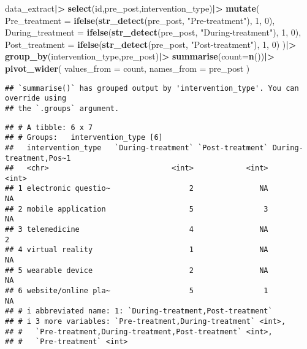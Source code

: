 \documentclass[
]{article}
\newenvironment{Shaded}{\begin{snugshade}}{\end{snugshade}}
\newcommand{\AttributeTok}[1]{\textcolor[rgb]{0.13,0.29,0.53}{#1}}
\newcommand{\DecValTok}[1]{\textcolor[rgb]{0.00,0.00,0.81}{#1}}
\newcommand{\FunctionTok}[1]{\textcolor[rgb]{0.13,0.29,0.53}{\textbf{#1}}}
\newcommand{\NormalTok}[1]{#1}
\newcommand{\SpecialCharTok}[1]{\textcolor[rgb]{0.81,0.36,0.00}{\textbf{#1}}}
\newcommand{\StringTok}[1]{\textcolor[rgb]{0.31,0.60,0.02}{#1}}
\begin{document}
\begin{Shaded}
\begin{Highlighting}[]
\NormalTok{data\_extract}\SpecialCharTok{|\textgreater{}}
  \FunctionTok{select}\NormalTok{(id,pre\_post,intervention\_type)}\SpecialCharTok{|\textgreater{}}
  \FunctionTok{mutate}\NormalTok{(}
    \AttributeTok{Pre\_treatment =} \FunctionTok{ifelse}\NormalTok{(}\FunctionTok{str\_detect}\NormalTok{(pre\_post, }\StringTok{"Pre{-}treatment"}\NormalTok{), }\DecValTok{1}\NormalTok{, }\DecValTok{0}\NormalTok{),}
    \AttributeTok{During\_treatment =} \FunctionTok{ifelse}\NormalTok{(}\FunctionTok{str\_detect}\NormalTok{(pre\_post, }\StringTok{"During{-}treatment"}\NormalTok{), }\DecValTok{1}\NormalTok{, }\DecValTok{0}\NormalTok{),}
    \AttributeTok{Post\_treatment =} \FunctionTok{ifelse}\NormalTok{(}\FunctionTok{str\_detect}\NormalTok{(pre\_post, }\StringTok{"Post{-}treatment"}\NormalTok{), }\DecValTok{1}\NormalTok{, }\DecValTok{0}\NormalTok{)}
\NormalTok{  )}\SpecialCharTok{|\textgreater{}}
  \FunctionTok{group\_by}\NormalTok{(intervention\_type,pre\_post)}\SpecialCharTok{|\textgreater{}}
  \FunctionTok{summarise}\NormalTok{(}\AttributeTok{count=}\FunctionTok{n}\NormalTok{())}\SpecialCharTok{|\textgreater{}}
  \FunctionTok{pivot\_wider}\NormalTok{(}
    \AttributeTok{values\_from =}\NormalTok{ count,}
    \AttributeTok{names\_from =}\NormalTok{ pre\_post}
\NormalTok{  )}
\end{Highlighting}
\end{Shaded}

\begin{verbatim}
## `summarise()` has grouped output by 'intervention_type'. You can override using
## the `.groups` argument.
\end{verbatim}

\begin{verbatim}
## # A tibble: 6 x 7
## # Groups:   intervention_type [6]
##   intervention_type   `During-treatment` `Post-treatment` During-treatment,Pos~1
##   <chr>                            <int>            <int>                  <int>
## 1 electronic questio~                  2               NA                     NA
## 2 mobile application                   5                3                     NA
## 3 telemedicine                         4               NA                      2
## 4 virtual reality                      1               NA                     NA
## 5 wearable device                      2               NA                     NA
## 6 website/online pla~                  5                1                     NA
## # i abbreviated name: 1: `During-treatment,Post-treatment`
## # i 3 more variables: `Pre-treatment,During-treatment` <int>,
## #   `Pre-treatment,During-treatment,Post-treatment` <int>,
## #   `Pre-treatment` <int>
\end{verbatim}
\end{document}
